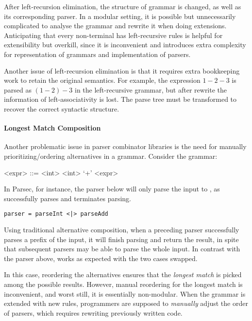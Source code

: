 
After left-recursion elimination, the structure of grammar is changed,
as well as its corresponding parser. In a modular setting, it is
possible but unnecessarily complicated to analyse the grammar and
rewrite it when doing extensions. Anticipating that every non-terminal
has left-recursive rules is helpful for extensibility but overkill,
since it is inconvenient and introduces extra complexity for
representation of grammars and implementation of parsers.

Another issue of left-recursion elimination is that it requires extra
bookkeeping work to retain the original semantics. For example, the
expression $1-2-3$ is parsed as $(1-2)-3$ in the left-recursive
grammar, but after rewrite the information of left-associativity is lost. The parse tree
must be transformed to recover the correct syntactic structure.

\paragraph{Longest Match Composition} Another problematic issue
in parser combinator libraries is the need for manually prioritizing/ordering
alternatives in a grammar.
Consider the grammar:
\setlength{\grammarindent}{5em}
\begin{grammar}
<expr> ::= <int> \alt <int> `+' <expr>
\end{grammar}

In Parsec, for instance, the parser below will only parse the input  to , as  successfully parses 
and terminates parsing.

\begin{lstlisting}[language=PlainCode]
parser = parseInt <|> parseAdd
\end{lstlisting}

Using traditional alternative composition, when a preceding parser successfully parses a prefix of the input, it will finish parsing and return the result, in spite that subsequent parsers may be able to parse the whole input. In contrast with the parser above,  works as expected with the two cases swapped.

In this case, reordering the alternatives ensures that
the \emph{longest match} is picked among the possible results. However, manual reordering for the longest match is inconvenient, and worst still, it is essentially non-modular. When the grammar is extended with new rules, programmers are supposed to \emph{manually} adjust
the order of parsers, which requires rewriting previously written code.

